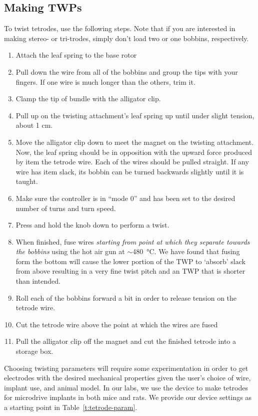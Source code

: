 \documentclass[11pt,a4paper]{article}
\begin{document}
\subsection{Making TWPs}
To twist tetrodes, use the following steps. Note that if you are interested in
making stereo- or tri-trodes, simply don't load two or one bobbins, respectively.

\begin{enumerate}[noitemsep]
    \item Attach the leaf spring to the base rotor
    \item Pull down the wire from all of the bobbins and group the tips with
        your fingers. If one wire is much longer than the others, trim it.
    \item Clamp the tip of bundle with the alligator clip.
    \item Pull up on the twisting attachment's leaf spring up until under
        slight tension, about 1 cm.
    \item Move the alligator clip down to meet the magnet on the twisting attachment.
        Now, the leaf spring should be in opposition with the upward force
        produced by item the tetrode wire. Each of the wires should be pulled
        straight. If any wire has item slack, its bobbin can be turned
        backwards slightly until it is taught.
    \item Make sure the controller is in ``mode 0'' and has been set to the
        desired number of turns and turn speed.
    \item Press and hold the knob down to perform a twist.
    \item When finished, fuse wires \textit{starting from point at which
        they separate towards the bobbins} using the hot air gun at
        $\sim$\SI{480}{\celsius}. We have found that fusing form the bottom will cause
        the lower portion of the TWP to `absorb' slack from above resulting in
        a very fine twist pitch and an TWP that is shorter than intended.
    \item Roll each of the bobbins forward a bit in order to release tension
        on the tetrode wire.
    \item Cut the tetrode wire above the point at which the wires are fused
    \item Pull the alligator clip off the magnet and cut the finished
        tetrode into a storage box.
\end{enumerate}

Choosing twisting parameters will require some experimentation in order to get
electrodes with the desired mechanical properties given the user's choice of
wire, implant use, and animal model. In our labs, we use the device to make
tetrodes for microdrive implants in both mice and rats. We provide our device
settings as a starting point in Table~\ref{t:tetrode-param}.
\end{document}
